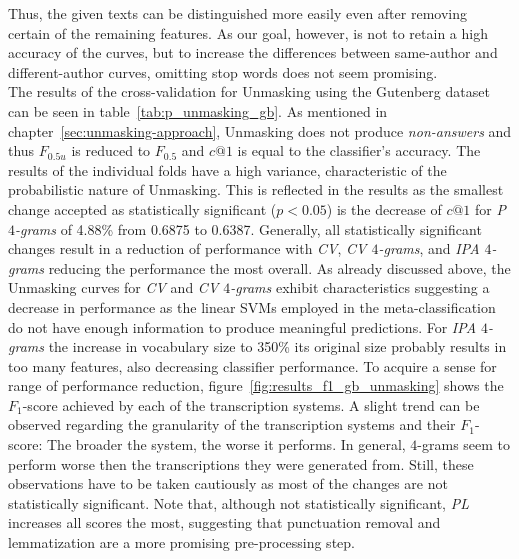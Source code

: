 Thus, the given texts can be distinguished more easily even after removing certain of the remaining features.
As our goal, however, is not to retain a high accuracy of the curves, but to increase the differences between same-author and different-author curves, omitting stop words does not seem promising.\\
The results of the cross-validation for Unmasking using the Gutenberg dataset can be seen in table~\ref{tab:p_unmasking_gb}.
As mentioned in chapter~\ref{sec:unmasking-approach}, Unmasking does not produce \textit{non-answers} and thus $F_{0.5u}$ is reduced to $F_{0.5}$ and $c@1$ is equal to the classifier's accuracy.
The results of the individual folds have a high variance, characteristic of the probabilistic nature of Unmasking.
This is reflected in the results as the smallest change accepted as statistically significant ($p<0.05$) is the decrease of $c@1$ for \textit{P $4$-grams} of 4.88\% from 0.6875 to 0.6387.
Generally, all statistically significant changes result in a reduction of performance with \textit{CV}, \textit{CV $4$-grams}, and \textit{IPA $4$-grams} reducing the performance the most overall.
As already discussed above, the Unmasking curves for \textit{CV} and \textit{CV $4$-grams} exhibit characteristics suggesting a decrease in performance as the linear SVMs employed in the meta-classification do not have enough information to produce meaningful predictions.
For \textit{IPA $4$-grams} the increase in vocabulary size to 350\% its original size probably results in too many features, also decreasing classifier performance.
To acquire a sense for range of performance reduction, figure~\ref{fig:results_f1_gb_unmasking} shows the $F_1$-score achieved by each of the transcription systems.
A slight trend can be observed regarding the granularity of the transcription systems and their $F_1$-score:
The broader the system, the worse it performs.
In general, $4$-grams seem to perform worse then the transcriptions they were generated from.
Still, these observations have to be taken cautiously as most of the changes are not statistically significant.
Note that, although not statistically significant, \textit{PL} increases all scores the most, suggesting that punctuation removal and lemmatization are a more promising pre-processing step.\\

